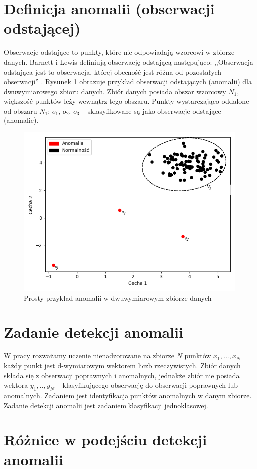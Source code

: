 \section{Definicja anomalii (obserwacji odstającej)}
Obserwacje odstające to punkty, które nie odpowiadają wzorcowi w zbiorze danych. Barnett i Lewis definiują obserwację odstającą następująco: ,,Obserwacja odstająca jest to obserwacja, której obecność jest różna od pozostałych obserwacji'' \cite{barnett1984outliers}. Rysunek \ref{fig:anomalia} obrazuje przykład obserwacji odstających (anomalii) dla dwuwymiarowego zbioru danych. Zbiór danych posiada obszar wzorcowy {$N_1$}, większość punktów leży wewnątrz tego obszaru. Punkty wystarczająco oddalone od obszaru $N_1$: $o_1$, $o_2$, $o_3$ -- sklasyfikowane są jako obserwacje odstające (anomalie).
\begin{figure}
    \centering
    \includegraphics[width=.5\textwidth]{chapters/istniejace/images/anomalia.png}
    \caption{Prosty przykład anomalii w dwuwymiarowym zbiorze danych}
    \label{fig:anomalia}
\end{figure}

\section{Zadanie detekcji anomalii}
W pracy rozważamy uczenie nienadzorowane na zbiorze $N$ punktów $x_1,...,x_N$ każdy punkt jest d-wymiarowym wektorem liczb rzeczywistych. Zbiór danych składa się z obserwacji poprawnych i anomalnych, jednakże zbiór nie posiada wektora $y_1,..,y_N$ -- klasyfikującego obserwację do obserwacji poprawnych lub anomalnych. Zadaniem jest identyfikacja punktów anomalnych w danym zbiorze. Zadanie detekcji anomalii jest zadaniem klasyfikacji jednoklasowej. 

\section{Różnice w podejściu detekcji anomalii}


